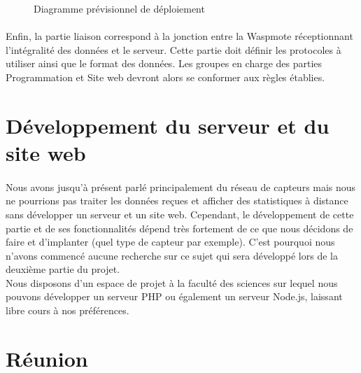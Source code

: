    \begin{figure}[!h]
        \centering
        \begin{changemargin}{-1.5cm}{-1.5cm}
            
        \end{changemargin}
        \caption{Diagramme prévisionnel de déploiement}
        \label{fig:gantt}
    \end{figure}

    \paragraph{}Enfin, la partie liaison correspond à la jonction entre la Waspmote réceptionnant l'intégralité des données et le serveur. Cette partie doit définir les protocoles à utiliser ainsi que le format des données. Les groupes en charge des parties Programmation et Site web devront alors se conformer aux règles établies.




\section{Développement du serveur et du site web}
    \paragraph{}Nous avons jusqu'à présent parlé principalement du réseau de capteurs mais nous ne pourrions pas traiter les données reçues et afficher des statistiques à distance sans développer un serveur et un site web. Cependant, le développement de cette partie et de ses fonctionnalités dépend très fortement de ce que nous décidons de faire et d'implanter (quel type de capteur par exemple). C'est pourquoi nous n'avons commencé aucune recherche sur ce sujet qui sera développé lors de la deuxième partie du projet.\\
    Nous disposons d'un espace de projet à la faculté des sciences sur lequel nous pouvons développer un serveur PHP ou également un serveur Node.js, laissant libre cours à nos préférences. 

\section{Réunion}
